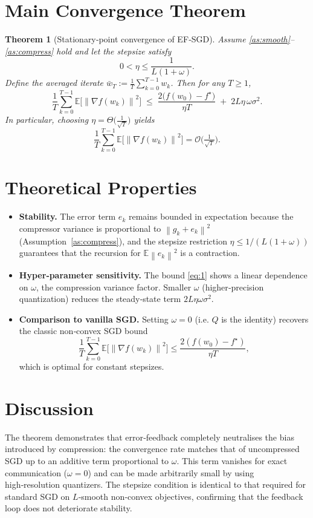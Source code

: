 \documentclass{article}
\newtheorem{theorem}{Theorem}
\newcommand{\E}{\mathbb{E}}
\newcommand{\norm}[1]{\left\lVert#1\right\rVert}
\begin{document}
\section*{Main Convergence Theorem}
\begin{theorem}[Stationary‑point convergence of EF‑SGD]\label{thm:main}
Assume \ref{as:smooth}–\ref{as:compress} hold and let the stepsize satisfy
\[
0<\eta\le\frac{1}{L(1+\omega)} .
\]
Define the averaged iterate $\bar w_T:=\frac1T\sum_{k=0}^{T-1}w_k$.
Then for any $T\ge1$,
\[
\frac{1}{T}\sum_{k=0}^{T-1}\E\!\big[\norm{\nabla f(w_k)}^2\big]
\;\le\;
\frac{2\big(f(w_0)-f^\star\big)}{\eta T}
\;+\;
2L\eta\,\omega\sigma^2 .
\tag{1}
\]
In particular, choosing $\eta=\Theta\!\big(\frac{1}{\sqrt{T}}\big)$ yields
\[
\frac{1}{T}\sum_{k=0}^{T-1}\E\!\big[\norm{\nabla f(w_k)}^2\big]=\mathcal{O}\!\big(\tfrac{1}{\sqrt{T}}\big).
\]
\end{theorem}

\section*{Theoretical Properties}
\begin{itemize}
\item \textbf{Stability.} The error term $e_k$ remains bounded in expectation because the compressor variance is proportional to $\norm{g_k+e_k}^2$ (Assumption~\ref{as:compress}), and the stepsize restriction $\eta\le 1/(L(1+\omega))$ guarantees that the recursion for $\E\norm{e_k}^2$ is a contraction.
\item \textbf{Hyper‑parameter sensitivity.} The bound \eqref{eq:1} shows a linear dependence on $\omega$, the compression variance factor. Smaller $\omega$ (higher‑precision quantization) reduces the steady‑state term $2L\eta\omega\sigma^2$.
\item \textbf{Comparison to vanilla SGD.} Setting $\omega=0$ (i.e. $Q$ is the identity) recovers the classic non‑convex SGD bound
\[
\frac{1}{T}\sum_{k=0}^{T-1}\E\!\big[\norm{\nabla f(w_k)}^2\big]\le\frac{2(f(w_0)-f^\star)}{\eta T},
\]
which is optimal for constant stepsizes.
\end{itemize}

\section*{Discussion}
The theorem demonstrates that error‑feedback completely neutralises the bias introduced by compression: the convergence rate matches that of uncompressed SGD up to an additive term proportional to $\omega$. This term vanishes for exact communication ($\omega=0$) and can be made arbitrarily small by using high‑resolution quantizers. The stepsize condition is identical to that required for standard SGD on $L$‑smooth non‑convex objectives, confirming that the feedback loop does not deteriorate stability.
\end{document}
